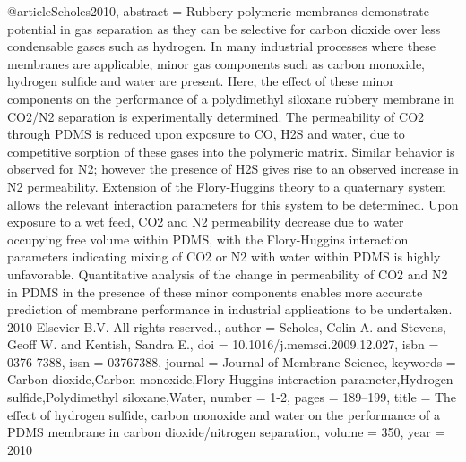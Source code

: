 @article{Scholes2010,
abstract = {Rubbery polymeric membranes demonstrate potential in gas separation as they can be selective for carbon dioxide over less condensable gases such as hydrogen. In many industrial processes where these membranes are applicable, minor gas components such as carbon monoxide, hydrogen sulfide and water are present. Here, the effect of these minor components on the performance of a polydimethyl siloxane rubbery membrane in CO2/N2 separation is experimentally determined. The permeability of CO2 through PDMS is reduced upon exposure to CO, H2S and water, due to competitive sorption of these gases into the polymeric matrix. Similar behavior is observed for N2; however the presence of H2S gives rise to an observed increase in N2 permeability. Extension of the Flory-Huggins theory to a quaternary system allows the relevant interaction parameters for this system to be determined. Upon exposure to a wet feed, CO2 and N2 permeability decrease due to water occupying free volume within PDMS, with the Flory-Huggins interaction parameters indicating mixing of CO2 or N2 with water within PDMS is highly unfavorable. Quantitative analysis of the change in permeability of CO2 and N2 in PDMS in the presence of these minor components enables more accurate prediction of membrane performance in industrial applications to be undertaken. {\textcopyright} 2010 Elsevier B.V. All rights reserved.},
author = {Scholes, Colin A. and Stevens, Geoff W. and Kentish, Sandra E.},
doi = {10.1016/j.memsci.2009.12.027},
isbn = {0376-7388},
issn = {03767388},
journal = {Journal of Membrane Science},
keywords = {Carbon dioxide,Carbon monoxide,Flory-Huggins interaction parameter,Hydrogen sulfide,Polydimethyl siloxane,Water},
number = {1-2},
pages = {189--199},
title = {{The effect of hydrogen sulfide, carbon monoxide and water on the performance of a PDMS membrane in carbon dioxide/nitrogen separation}},
volume = {350},
year = {2010}
}
